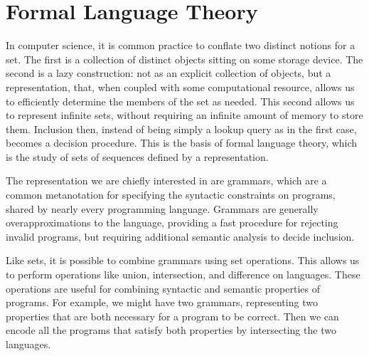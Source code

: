 \chapter{\rm\bfseries Formal Language Theory}
\label{ch:chapter01}

In computer science, it is common practice to conflate two distinct notions for a set. The first is a collection of distinct objects sitting on some storage device. The second is a lazy construction: not as an explicit collection of objects, but a representation, that, when coupled with some computational resource, allows us to efficiently determine the members of the set as needed. This second allows us to represent infinite sets, without requiring an infinite amount of memory to store them. Inclusion then, instead of being simply a lookup query as in the first case, becomes a decision procedure. This is the basis of formal language theory, which is the study of sets of sequences defined by a representation.

The representation we are chiefly interested in are grammars, which are a common metanotation for specifying the syntactic constraints on programs, shared by nearly every programming language. Grammars are generally overapproximations to the language, providing a fast procedure for rejecting invalid programs, but requiring additional semantic analysis to decide inclusion.

Like sets, it is possible to combine grammars using set operations. This allows us to perform operations like union, intersection, and difference on languages. These operations are useful for combining syntactic and semantic properties of programs. For example, we might have two grammars, representing two properties that are both necessary for a program to be correct. Then we can encode all the programs that satisfy both properties by intersecting the two languages.